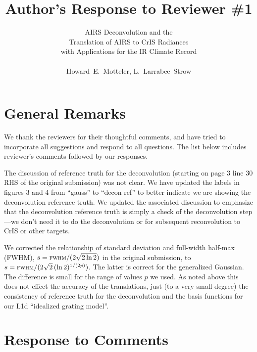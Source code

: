 \documentclass[11pt]{article}
\begin{document}
\title{Author's Response to Reviewer \#1 }

\author{AIRS Deconvolution and the \\
       Translation of AIRS to CrIS Radiances \\ 
       with Applications for the IR Climate Record \\
       \\
       Howard~E.~Motteler, L.~Larrabee~Strow}

\maketitle

\section{General Remarks}

We thank the reviewers for their thoughtful comments, and have tried
to incorporate all suggestions and respond to all questions.  The list
below includes reviewer's comments followed by our responses.

The discussion of reference truth for the deconvolution (starting on
page 3 line 30 RHS of the original submission) was not clear.  We
have updated the labels in figures 3 and 4 from ``gauss'' to ``decon
ref'' to better indicate we are showing the deconvolution reference
truth.  We updated the associated discussion to emphasize that the
deconvolution reference truth is simply a check of the deconvolution
step---we don't need it to do the deconvolution or for subsequent
reconvolution to CrIS or other targets.

We corrected the relationship of standard deviation and full-width
half-max (FWHM), $s=\mbox{\small\textsc{fwhm}} / (2\sqrt{2\ln 2})$ in the original
submission, to $s=\mbox{\small\textsc{fwhm}} / (2\sqrt{2}\,(\ln 2)^{1/(2p)})$.  The
latter is correct for the generalized Gaussian.  The difference is
small for the range of values $p$ we used.  As noted above this does
not effect the accuracy of the translations, just (to a very small
degree) the consistency of reference truth for the deconvolution and
the basis functions for our L1d ``idealized grating model''.

\section{Response to Comments}
\end{document}
